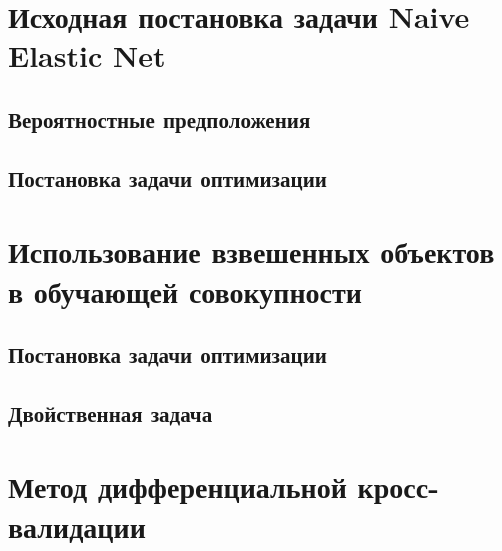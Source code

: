 \documentclass[12pt]{article}
\begin{document}
	\newpage \tableofcontents

	\section{Исходная постановка задачи Naive Elastic Net}
		\subsection{Вероятностные предположения}	
		\subsection{Постановка задачи оптимизации} 	
	\section{Использование взвешенных объектов в обучающей совокупности}
		\subsection{Постановка задачи оптимизации} 	
		\subsection{Двойственная задача}	
	\section{Метод дифференциальной кросс-валидации}
		
\end{document}
